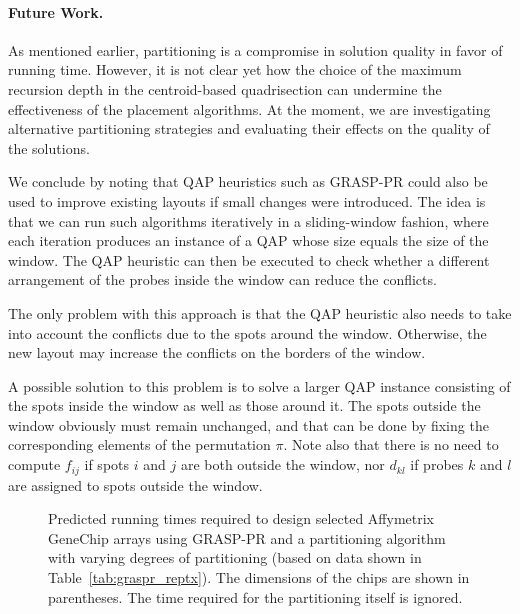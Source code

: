 \documentclass[english]{lni}
\begin{document}
\paragraph{Future Work.}
As mentioned earlier, partitioning is a compromise in solution quality in favor
of running time. However, it is not clear yet how the choice of the maximum
recursion depth in the centroid-based quadrisection can undermine the
effectiveness of the placement algorithms. At the moment, we are investigating
alternative partitioning strategies and evaluating their effects on the quality
of the solutions.

We conclude by noting that QAP heuristics such as GRASP-PR could also be used to
improve existing layouts if small changes were introduced. The idea is that we
can run such algorithms iteratively in a sliding-window fashion, where each
iteration produces an instance of a QAP whose size equals the size of the
window. The QAP heuristic can then be executed to check whether a different
arrangement of the probes inside the window can reduce the conflicts.

The only problem with this approach is that the QAP heuristic also needs to take
into account the conflicts due to the spots around the window. Otherwise, the
new layout may increase the conflicts on the borders of the window.

A possible solution to this problem is to solve a larger QAP instance
consisting of the spots inside the window as well as those around it. The
spots outside the window obviously must remain unchanged, and that can be done
by fixing the corresponding elements of the permutation $\pi$. Note also that
there is no need to compute $f_{ij}$ if spots $i$ and $j$ are both outside the
window, nor $d_{kl}$ if probes $k$ and $l$ are assigned to spots outside the
window.

\begin{figure}
{\footnotesize \centerline{}}
\caption{Predicted running times required to design selected Affymetrix GeneChip
arrays using GRASP-PR and a partitioning algorithm with varying degrees of
partitioning (based on data shown in Table~\ref{tab:graspr_reptx}). The
dimensions of the chips are shown in parentheses. The time required for the
partitioning itself is ignored.}\label{fig:time_extrapolation}
\end{figure}
\end{document}
